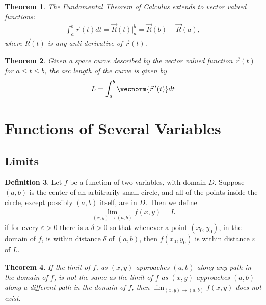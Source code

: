 \documentclass{article}[11pt]
\newtheorem{theorem}{Theorem}[section]
\theoremstyle{definition}
\newtheorem{definition}[theorem]{Definition}
\numberwithin{equation}{section}
\begin{document}
\begin{theorem}
	The Fundamental Theorem of Calculus extends to vector valued functions:
	\begin{align}
	\int_{a}^{b} \vec{r}(t)dt= \vec{R}(t)\Big|_a^b = \vec{R}(b)-\vec{R}(a),
	\end{align}
	where \( \vec{R}(t) \) is any anti-derivative of \(\vec{r}(t)\).
\end{theorem}

\begin{theorem}
	Given a space curve described by the vector valued function \(\vec{r}(t)\) for \(a\leq t \leq b\), the arc length of the curve is given by
	\begin{align*}
		L= \int_{a}^{b}\vecnorm{\vec{r}\:'(t)}dt
	\end{align*}
\end{theorem}

\section{Functions of Several Variables}
\subsection{Limits}
\begin{definition}
	Let \(f\) be a function of two variables, with domain \(D\). Suppose \((a,b)\) is the center of an arbitrarily small circle, and all of the points inside the circle, except possibly \((a,b)\) itself, are in \(D\). Then we define 
	\begin{align*}
	\lim_{(x,y)\to (a,b)} f(x,y)=L
	\end{align*}
	if for every \( \varepsilon>0 \) there is a \( \delta>0 \) so that whenever a point \((x_0,y_0)\), in the domain of \(f\), is within distance \(\delta\) of \((a,b)\), then \(f(x_0,y_0)\) is within distance \(\varepsilon\) of \(L\).
\end{definition}

\begin{theorem}
	If the limit of \(f\), as \((x,y)\) approaches \((a,b)\) along any path in the domain of \(f\), is not the same as the limit of \(f\) as \((x,y)\) approaches \((a,b)\) along a different path in the domain of \(f\), then \( \lim_{(x,y)\to (a,b)} f(x,y) \) does not exist.
\end{theorem}
\end{document}
